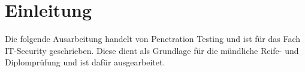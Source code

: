 \section{Einleitung}
Die folgende Ausarbeitung handelt von Penetration Testing und ist für das Fach IT-Security geschrieben. Diese dient als Grundlage für die mündliche Reife- und Diplomprüfung und ist dafür ausgearbeitet. 